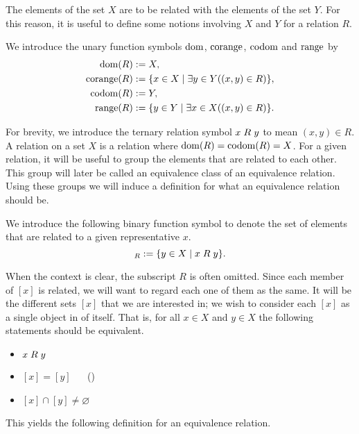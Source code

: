 \documentclass[../main.tex]{subfiles}
\begin{document}
The elements of the set $X$ are to be related with the elements of the set $Y$. For this reason, it is useful to define some notions involving $X$ and $Y$ for a relation $R$.
\begin{definition}
    We introduce the unary function symbols $\operatorname{dom}$, $\operatorname{corange}$, $\operatorname{codom}$ and $\operatorname{range}$ by
    \begin{align*}
        \operatorname{dom}(R) & :=X, \\
        \operatorname{corange}(R) & :=\{x\in X\mid\exists y\in Y((x,y)\in R)\}, \\
        \operatorname{codom}(R) & :=Y, \\
        \operatorname{range}(R) & :=\{y\in Y\mid\exists x\in X((x,y)\in R)\}.
    \end{align*}
\end{definition}
For brevity, we introduce the ternary relation symbol $x\mathrel{R} y$ to mean $(x,y)\in R$. A relation on a set $X$ is a relation where $\operatorname{dom}(R)=\operatorname{codom}(R)=X$. For a given relation, it will be useful to group the elements that are related to each other. This group will later be called an equivalence class of an equivalence relation. Using these groups we will induce a definition for what an equivalence relation should be.
\begin{definition}\label{dfn:zermelo_fraenkel_set_theory:equivalence_relation}
    We introduce the following binary function symbol to denote the set of elements that are related to a given representative $x$.
    \begin{equation*}
        [x]_R:=\{y\in X\mid x\relR y\}.
    \end{equation*}
\end{definition}
When the context is clear, the subscript $R$ is often omitted. Since each member of $[x]$ is related, we will want to regard each one of them as the same. It will be the different sets $[x]$ that we are interested in; we wish to consider each $[x]$ as a single object in of itself. That is, for all $x\in X$ and $y\in X$ the following statements should be equivalent.
\begin{itemize}
    \item $x\mathrel{R} y$
    \item $[x]=[y]$ ~~ \hspace*{\fill} \mbox{(\theequation)}\label{eqn:zermelo_fraenkel_set_theory:equivalence_relation}
    \item $[x]\cap[y]\neq\varnothing$
\end{itemize}
This yields the following definition for an equivalence relation.
\end{document}
